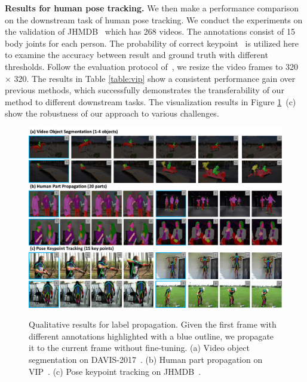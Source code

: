\documentclass{article}
\begin{document}
\textbf{Results for human pose tracking.} We then make a performance comparison on the downstream task of human pose tracking. We conduct the experiments on the validation of JHMDB~\cite{jhuang2013towards} which has 268 videos. The annotations consist of 15 body joints for each person. The probability of correct keypoint~\cite{yang2012articulated} is utilized here to examine the accuracy between result and ground truth with different thresholds. Follow the evaluation protocol of~\cite{jabri2020space}\cite{li2019joint}, we resize the video frames to 320 $\times$ 320. The results in Table \ref{table:vip} show a consistent performance gain over previous methods, which successfully demonstrates the transferability of our method to different downstream tasks. The visualization results in Figure \ref{fig:quan}~(c) show the robustness of our approach to various challenges.


\begin{figure}[!tb]
  \centering
  {\includegraphics[width=1.0\textwidth]{figure/quantitative_results/quan.pdf}}
  \caption{\small Qualitative results for label propagation. Given the first frame with different annotations highlighted with a blue outline, we propagate it to the current frame without fine-tuning. (a) Video object segmentation on DAVIS-2017~\cite{pont20172017}. (b) Human part propagation on VIP~\cite{zhou2018adaptive}. (c) Pose keypoint tracking on JHMDB~\cite{jhuang2013towards}. }
  \label{fig:quan}
  \vspace{-4mm}
\end{figure}
\end{document}
